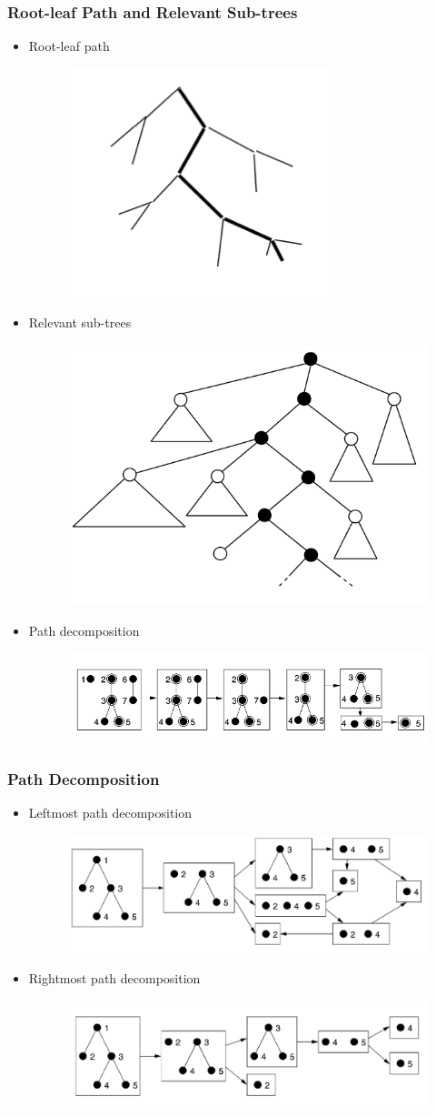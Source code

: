 \documentclass{beamer}
\begin{document}
\begin{frame}
\frametitle{Root-leaf Path and Relevant Sub-trees}
\begin{itemize}
\item Root-leaf path
\begin{figure}
	\includegraphics[width=0.2\linewidth]{RootLeafPath}
	\centering
\end{figure}
\item Relevant sub-trees
\begin{figure}
	\includegraphics[width=0.3\linewidth]{RelevantSubtrees}
	\centering
\end{figure}
\item Path decomposition
\begin{figure}
	\includegraphics[width=0.6\linewidth]{KleinAlgorithmExample}
	\centering
\end{figure}
\end{itemize}
\end{frame}
\begin{frame}
\frametitle{Path Decomposition}
\begin{itemize}
\item Leftmost path decomposition
\begin{figure}
	\includegraphics[width=0.6\linewidth]{LeftmostPathDecomposition}
	\centering
\end{figure}
\item Rightmost path decomposition
\begin{figure}
	\includegraphics[width=0.6\linewidth]{RightmostPathDecomposition}
	\centering
\end{figure}
\end{itemize}
\end{frame}
\end{document}
